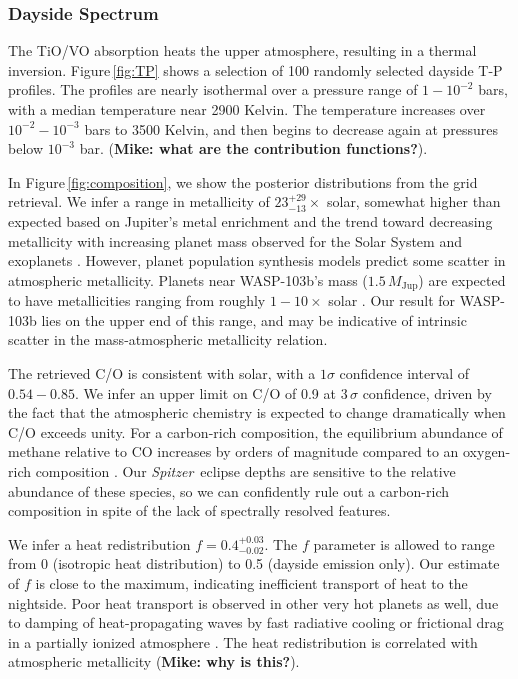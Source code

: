 \documentclass[twocolumn]{aastex61}
\newcommand{\project}[1]{\textsl{#1}}
\newcommand{\Spitzer}{\project{Spitzer}}
\begin{document}
\subsubsection{Dayside Spectrum}



The TiO/VO absorption heats the upper atmosphere, resulting in a thermal inversion. Figure\,\ref{fig:TP} shows a selection of 100 randomly selected dayside T-P profiles. The profiles are nearly isothermal over a pressure range of $1-10^{-2}$ bars, with a median temperature near 2900 Kelvin. The temperature increases over $10^{-2} - 10^{-3}$ bars to 3500 Kelvin, and then begins to decrease again at pressures below $10^{-3}$ bar. (\textbf{Mike: what are the contribution functions?}). 


In Figure\,\ref{fig:composition}, we show the posterior distributions from the grid retrieval.  We infer a range in metallicity of $23^{+29}_{-13}\times$ solar, somewhat higher than expected based on Jupiter's metal enrichment \citep[$3-5\times$ solar;][]{wong04} and the trend toward decreasing metallicity with increasing planet mass observed for the Solar System and exoplanets \cite[e.g.][]{kreidberg14b}.  However, planet population synthesis models predict some scatter in atmospheric metallicity. Planets near WASP-103b's mass ($1.5\,M_\mathrm{Jup}$) are expected to have metallicities ranging from roughly $1-10\times$ solar \citep{mordasini16}. Our result for WASP-103b lies on the upper end of this range, and may be indicative of intrinsic scatter in the mass-atmospheric metallicity relation. 

The retrieved C/O is consistent with solar, with a $1\sigma$ confidence interval of $0.54 - 0.85$. We infer an upper limit on C/O of 0.9 at $3\,\sigma$ confidence, driven by the fact that the atmospheric chemistry is expected to change dramatically when C/O exceeds unity. For a carbon-rich composition, the equilibrium abundance of methane relative to CO increases by orders of magnitude compared to an oxygen-rich  composition \citep[e.g.][]{madhusudhan11}. Our \Spitzer\ eclipse depths are sensitive to the relative abundance of these species, so we can confidently rule out a carbon-rich composition in spite of the lack of spectrally resolved features.  

We infer a heat redistribution $f = 0.4^{+0.03}_{-0.02}$. The $f$ parameter is allowed to range from 0 (isotropic heat distribution) to 0.5 (dayside emission only). Our estimate of $f$ is close to the maximum, indicating inefficient transport of heat to the nightside. Poor heat transport is observed in other very hot planets as well, due to damping of heat-propagating waves by fast radiative cooling or frictional drag in a partially ionized atmosphere \citep{komacek16}. The heat redistribution is correlated with atmospheric metallicity (\textbf{Mike: why is this?}).  
\end{document}
